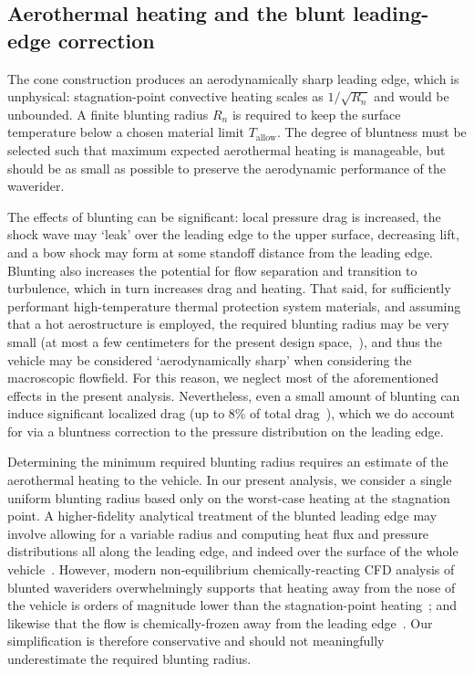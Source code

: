 \documentclass[10pt,a4paper]{article}
\begin{document}
\subsection{Aerothermal heating and the blunt leading-edge correction}\label{sec:blunting}

The cone construction produces an aerodynamically sharp leading edge, which is unphysical: stagnation-point convective heating scales as $1/\sqrt{R_n}$ and would be unbounded. A finite blunting radius $R_n$ is required to keep the surface temperature below a chosen material limit $T_{\text{allow}}$. The degree of bluntness must be selected such that maximum expected aerothermal heating is manageable, but should be as small as possible to preserve the aerodynamic performance of the waverider.

The effects of blunting can be significant: local pressure drag is increased, the shock wave may `leak' over the leading edge to the upper surface, decreasing lift, and a bow shock may form at some standoff distance from the leading edge. Blunting also increases the potential for flow separation and transition to turbulence, which in turn increases drag and heating. That said, for sufficiently performant high-temperature thermal protection system materials, and assuming that a hot aerostructure is employed, the required blunting radius may be very small (at most a few centimeters for the present design space,~\cite{Bowcutt:1986,Anderson:2019,Peters:2024}), and thus the vehicle may be considered `aerodynamically sharp' when considering the macroscopic flowfield. For this reason, we neglect most of the aforementioned effects in the present analysis. Nevertheless, even a small amount of blunting can induce significant localized drag (up to 8\% of total drag~\citep{Vanmol:1992}), which we do account for via a bluntness correction to the pressure distribution on the leading edge.

Determining the minimum required blunting radius requires an estimate of the aerothermal heating to the vehicle. In our present analysis, we consider a single uniform blunting radius based only on the worst-case heating at the stagnation point. A higher-fidelity analytical treatment of the blunted leading edge may involve allowing for a variable radius and computing heat flux and pressure distributions all along the leading edge, and indeed over the surface of the whole vehicle~\citep{Vanmol:1992}. However, modern non-equilibrium chemically-reacting CFD analysis of blunted waveriders overwhelmingly supports that heating away from the nose of the vehicle is orders of magnitude lower than the stagnation-point heating~\citep{Liu:2013}; and likewise that the flow is chemically-frozen away from the leading edge~\citep{Anderson:1992}. Our simplification is therefore conservative and should not meaningfully underestimate the required blunting radius.
\end{document}

